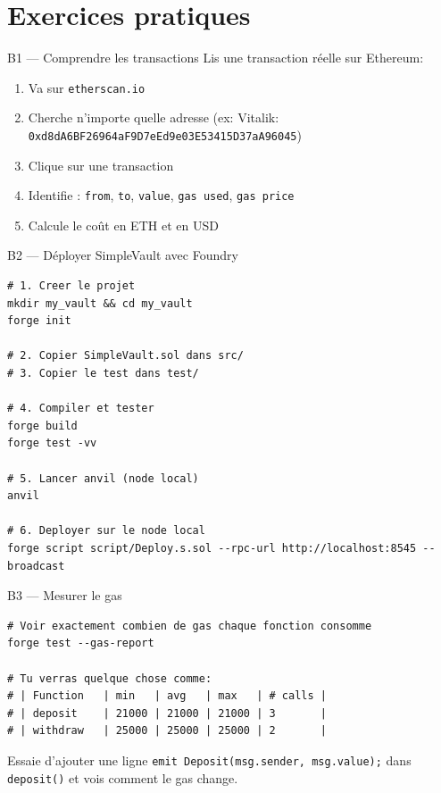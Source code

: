 \documentclass[12pt, a4paper]{article}
\begin{document}
\section{Exercices pratiques}

\begin{pratique}{B1 --- Comprendre les transactions}
Lis une transaction réelle sur Ethereum:
\begin{enumerate}
  \item Va sur \texttt{etherscan.io}
  \item Cherche n'importe quelle adresse (ex: Vitalik: \texttt{0xd8dA6BF26964aF9D7eEd9e03E53415D37aA96045})
  \item Clique sur une transaction
  \item Identifie : \texttt{from}, \texttt{to}, \texttt{value}, \texttt{gas used}, \texttt{gas price}
  \item Calcule le coût en ETH et en USD
\end{enumerate}
\end{pratique}

\begin{pratique}{B2 --- Déployer SimpleVault avec Foundry}
\begin{lstlisting}[style=bash]
# 1. Creer le projet
mkdir my_vault && cd my_vault
forge init

# 2. Copier SimpleVault.sol dans src/
# 3. Copier le test dans test/

# 4. Compiler et tester
forge build
forge test -vv

# 5. Lancer anvil (node local)
anvil

# 6. Deployer sur le node local
forge script script/Deploy.s.sol --rpc-url http://localhost:8545 --broadcast
\end{lstlisting}
\end{pratique}

\begin{pratique}{B3 --- Mesurer le gas}
\begin{lstlisting}[style=bash]
# Voir exactement combien de gas chaque fonction consomme
forge test --gas-report

# Tu verras quelque chose comme:
# | Function   | min   | avg   | max   | # calls |
# | deposit    | 21000 | 21000 | 21000 | 3       |
# | withdraw   | 25000 | 25000 | 25000 | 2       |
\end{lstlisting}
Essaie d'ajouter une ligne \texttt{emit Deposit(msg.sender, msg.value);} dans
\texttt{deposit()} et vois comment le gas change.
\end{pratique}
\end{document}
